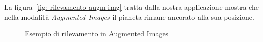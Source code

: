 \documentclass[crop=false, class=book]{standalone}
\begin{document}
		\noindent
		La figura~\vref{fig: rilevamento augm img} tratta dalla nostra applicazione mostra che nella modalità \emph{Augmented Images} il pianeta rimane ancorato alla sua posizione.
	
		\begin{figure}
			\centering
				  \quad
				 \quad
			\caption{Esempio di rilevamento in Augmented Images}
			\label{fig: rilevamento augm img}
		\end{figure}
\end{document}
